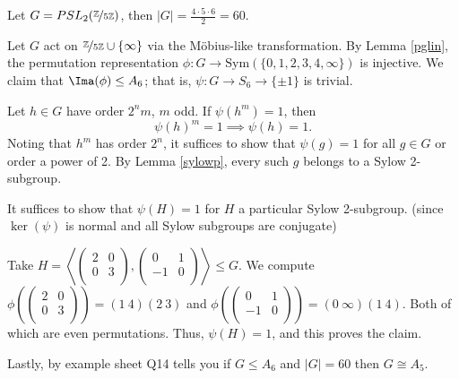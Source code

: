 \begin{example}
    Let \(G = PSL_2(\nicefrac{\mathbb{\MakeUppercase{Z}} }{5\mathbb{\MakeUppercase{Z}} })\), then \(\left\vert G \right\vert = \frac{4\cdot 5 \cdot 6}{2} = 60\).

    Let \(G\) act on \(\nicefrac{\mathbb{\MakeUppercase{Z}} }{5\mathbb{\MakeUppercase{Z}}}\cup \{\infty\}\) via the Möbius-like transformation. By Lemma \eqref{pglin}, the permutation representation \(\phi: G \to \mathrm{Sym}(\{0,1,2,3,4,\infty\})\) is injective. We claim that \(\Ima (\phi)\leq A_6\); that is, \(\psi:G \to S_6\to \{\pm 1\}\) is trivial.

    Let \(h \in G\) have order \(2^n m\), \(m\) odd. If \(\psi(h^m) = 1\), then \[\psi(h)^m = 1 \implies \psi(h) = 1.\] Noting that \(h^m\) has order \(2^n\), it suffices to show that \(\psi(g) = 1\) for all \(g \in G\) or order a power of 2. By Lemma \eqref{sylowp}, every such \(g\) belongs to a Sylow 2-subgroup.

    It suffices to show that \(\psi(H) = 1\) for \(H\) a particular Sylow 2-subgroup. (since \(\ker(\psi)\) is normal and all Sylow subgroups are conjugate)

    Take \(H = \left\langle \begin{pmatrix}
        2 &  0 \\
        0 &  3 \\
    \end{pmatrix},\begin{pmatrix}
        0 &  1 \\
        -1 &  0 \\
    \end{pmatrix}\right\rangle\leq G\). We compute
    \(\phi\left(\begin{pmatrix}
        2 &  0 \\
        0 &  3 \\
    \end{pmatrix}\right)=(1~4)(2~3)\)
     and 
    \(\phi\left(\begin{pmatrix}
        0 &  1 \\
        -1 &  0 \\
    \end{pmatrix}\right)=(0~\infty)(1~4)\). Both of which are even permutations. Thus, \(\psi(H) = 1\), and this proves the claim.

    Lastly, by example sheet Q14 tells you if \(G \leq A_6\) and \(\left\vert G \right\vert = 60\) then \(G \cong A_5\).
\end{example}
